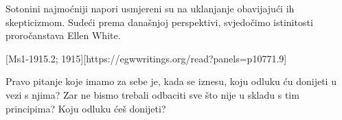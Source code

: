 Sotonini najmoćniji napori usmjereni su na uklanjanje  obavijajući ih skepticizmom. Sudeći prema današnjoj perspektivi, svjedočimo istinitosti proročanstava Ellen White.

[Ms1-1915.2; 1915][https://egwwritings.org/read?panels=p10771.9]

Pravo pitanje koje imamo za sebe je, kada se  iznesu, koju odluku ću donijeti u vezi s njima? Zar ne bismo trebali odbaciti sve što nije u skladu s tim principima? Koju odluku ćeš donijeti?

